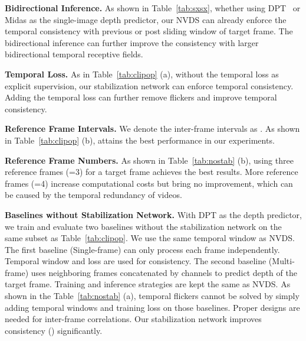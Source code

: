 \documentclass[10pt,twocolumn,letterpaper]{article}
\def\sx{NVDS}
\def\sbn{stabilization network}
\def\reftab{Table}
\begin{document}
\noindent \textbf{Bidirectional Inference.} As shown in \reftab{}~\ref{tab:sxsx}, whether using DPT~\cite{dpt} or Midas\cite{midas} as the single-image depth predictor, our \sx{} can already enforce the temporal consistency with previous or post sliding window of target frame. The bidirectional inference can further improve the consistency with larger bidirectional temporal receptive fields.

\noindent \textbf{Temporal Loss.} As in \reftab{}~\ref{tab:clipop} (a), without the temporal loss as explicit supervision, our \sbn{} can enforce temporal consistency. Adding the temporal loss can further remove flickers and improve temporal consistency.

\noindent \textbf{Reference Frame Intervals.} We denote the inter-frame intervals as . As shown in \reftab{}~\ref{tab:clipop} (b),  attains the best performance in our experiments.

\noindent \textbf{Reference Frame Numbers.} As shown in \reftab{}~\ref{tab:nostab} (b), using three reference frames (=3) for a target frame achieves the best results. 
More reference frames (=4) increase computational costs but bring no improvement, which can be caused by the temporal redundancy of videos.



\noindent \textbf{Baselines without Stabilization Network.} With DPT as the depth predictor, we train and evaluate two baselines without the stabilization network on the same subset as \reftab{}~\ref{tab:clipop}. We use the same temporal window as NVDS. The first baseline (Single-frame) can only process each frame independently. Temporal window and loss  are used for consistency. The second baseline (Multi-frame) uses neighboring frames concatenated by channels to predict depth of the target frame.
Training and inference strategies are kept the same as NVDS. As shown in the \reftab{}~\ref{tab:nostab} (a), temporal flickers cannot be solved by simply adding temporal windows and training loss on those baselines. Proper designs are needed for inter-frame correlations. Our stabilization network improves consistency () significantly.
\end{document}
